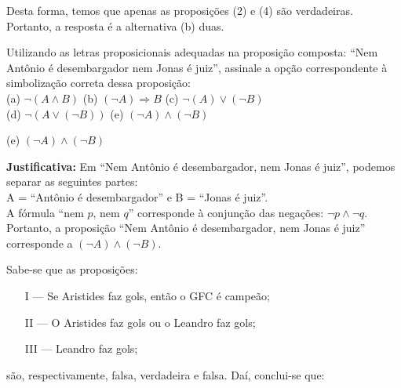 \documentclass[12pt, a4paper, onecolumn]{exam}
\begin{document}
\begin{questions}
\begin{solution}
        Desta forma, temos que apenas as proposições (2) e (4) são verdadeiras. Portanto, a resposta é a alternativa (b) duas.

        
    \end{solution}
    
    \question[q6] Utilizando as letras proposicionais adequadas na proposição composta: “Nem Antônio é  desembargador nem Jonas é juiz”, assinale a opção correspondente à simbolização correta dessa proposição: \\[1em]
        (a) \( \neg ( A \wedge B ) \)           \hfill
        (b) \( ( \neg A ) \Rightarrow B \)      \hfill
        (c) \( \neg ( A ) \vee ( \neg B ) \)    \\[1em]
        (d) \( \neg ( A \vee ( \neg B ) ) \)    \hfill
        (e) \( ( \neg A ) \wedge ( \neg B ) \)
        
    \begin{solution}
        (e) \( ( \neg A ) \wedge ( \neg B ) \)
        
        \textbf{Justificativa:}
        Em  “Nem Antônio é desembargador, nem Jonas é juiz”, podemos separar as seguintes partes: \\[1em]
            A = “Antônio é desembargador” e 
            B = “Jonas é juiz”.\\[1em]
        A fórmula “nem \(p\), nem \(q\)” corresponde à conjunção das negações: \( \neg p \wedge \neg q \).   \\[1em]
        Portanto, a proposição “Nem Antônio é desembargador, nem Jonas é juiz” corresponde a \( ( \neg A ) \wedge ( \neg B ) \).
    \end{solution}
    
    \pagebreak
    
    \question[q7] Sabe-se que as proposições:
        \begin{enumerate}
            \item[I] — Se Aristides faz gols, então o GFC é campeão;
            \item[II] — O Aristides faz gols ou o Leandro faz gols;
            \item[III] — Leandro faz gols;
        \end{enumerate}
    são, respectivamente, falsa, verdadeira e falsa. Daí, conclui-se que:
    
\end{questions}
\end{document}
